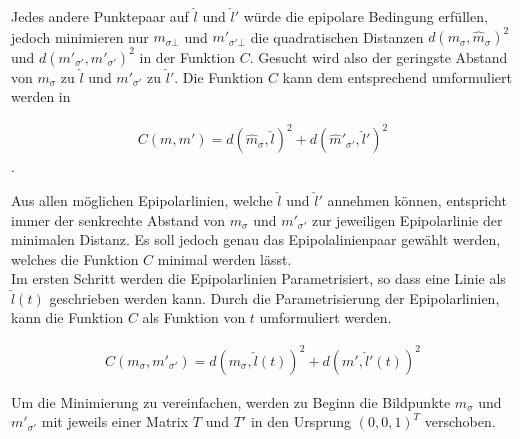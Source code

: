 Jedes andere Punktepaar auf $\hat{l}$ und $\hat{l}'$ würde die epipolare Bedingung erfüllen, jedoch minimieren nur $m_{\sigma\bot}$ und $m'_{\sigma' \bot}$ die quadratischen Distanzen $d(m_\sigma,\hat{m}_\sigma)^2$ und $ d(m'_{\sigma'},\hat{m}'_{\sigma'})^2$ in der Funktion $C$. Gesucht wird also der geringste Abstand von $m_\sigma$ zu $\hat{l}$ und $m'_{\sigma'}$ zu $\hat{l}'$. Die Funktion $C$ kann dem entsprechend umformuliert werden in 

\begin{gather}
	C(m,m') = d(\hat{m}_\sigma,\hat{l})^2 + d(\hat{m}'_{\sigma'},\hat{l}')^2
\end{gather}
.

Aus allen möglichen Epipolarlinien, welche $\hat{l}$ und $\hat{l}'$ annehmen können, entspricht immer der senkrechte Abstand von $m_\sigma$ und $m'_{\sigma'}$ zur jeweiligen Epipolarlinie der minimalen Distanz. Es soll jedoch genau das Epipolalinienpaar gewählt werden, welches die Funktion $C$ minimal werden lässt\cite{HZ}.\\

Im ersten Schritt werden die Epipolarlinien Parametrisiert, so dass eine Linie als $\hat{l}(t)$ geschrieben werden kann. Durch die Parametrisierung der Epipolarlinien, kann die Funktion $C$ als Funktion von $t$ umformuliert werden.


\begin{gather}
	C(m_\sigma,m'_{\sigma'}) = d(m_\sigma,\hat{l}(t))^2 + d(m',\hat{l}'(t))^2
\end{gather}


%
%
Um die Minimierung zu vereinfachen, werden zu Beginn die Bildpunkte $m_\sigma$ und $m'_{\sigma'} $ mit jeweils einer Matrix $T$ und $T'$ in den Ursprung $(0,0,1)^T$ verschoben. 


